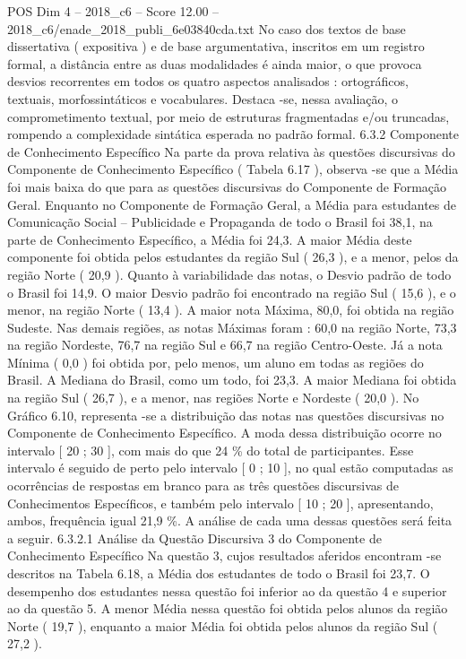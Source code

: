 \begin{textsample}{POS Dim 4 – 2018\_c6 – Score 12.00 – 2018\_c6/enade\_2018\_publi\_6e03840cda.txt}
No caso dos textos de base dissertativa ( expositiva ) e de base argumentativa, inscritos em um registro formal, a distância entre as duas modalidades é ainda maior, o que provoca desvios recorrentes em todos os quatro aspectos analisados : ortográficos, textuais, morfossintáticos e vocabulares.
Destaca -se, nessa avaliação, o comprometimento textual, por meio de estruturas fragmentadas e/ou truncadas, rompendo a complexidade sintática esperada no padrão formal. 6.3.2 Componente de Conhecimento Específico Na parte da prova relativa às questões discursivas do Componente de Conhecimento Específico ( Tabela 6.17 ), observa -se que a Média foi mais baixa do que para as questões discursivas do Componente de Formação Geral.
Enquanto no Componente de Formação Geral, a Média para estudantes de Comunicação Social – Publicidade e Propaganda de todo o Brasil foi 38,1, na parte de Conhecimento Específico, a Média foi 24,3.
A maior Média deste componente foi obtida pelos estudantes da região Sul ( 26,3 ), e a menor, pelos da região Norte ( 20,9 ).
Quanto à variabilidade das notas, o Desvio padrão de todo o Brasil foi 14,9.
O maior Desvio padrão foi encontrado na região Sul ( 15,6 ), e o menor, na região Norte ( 13,4 ).
A maior nota Máxima, 80,0, foi obtida na região Sudeste.
Nas demais regiões, as notas Máximas foram : 60,0 na região Norte, 73,3 na região Nordeste, 76,7 na região Sul e 66,7 na região Centro-Oeste.
Já a nota Mínima ( 0,0 ) foi obtida por, pelo menos, um aluno em todas as regiões do Brasil.
A Mediana do Brasil, como um todo, foi 23,3.
A maior Mediana foi obtida na região Sul ( 26,7 ), e a menor, nas regiões Norte e Nordeste ( 20,0 ).
No Gráfico 6.10, representa -se a distribuição das notas nas questões discursivas no Componente de Conhecimento Específico.
A moda dessa distribuição ocorre no intervalo [ 20 ; 30 ], com mais do que 24 \% do total de participantes.
Esse intervalo é seguido de perto pelo intervalo [ 0 ; 10 ], no qual estão computadas as ocorrências de respostas em branco para as três questões discursivas de Conhecimentos Específicos, e também pelo intervalo [ 10 ; 20 ], apresentando, ambos, frequência igual 21,9 \%.
A análise de cada uma dessas questões será feita a seguir. 6.3.2.1 Análise da Questão Discursiva 3 do Componente de Conhecimento Específico Na questão 3, cujos resultados aferidos encontram -se descritos na Tabela 6.18, a Média dos estudantes de todo o Brasil foi 23,7.
O desempenho dos estudantes nessa questão foi inferior ao da questão 4 e superior ao da questão 5.
A menor Média nessa questão foi obtida pelos alunos da região Norte ( 19,7 ), enquanto a maior Média foi obtida pelos alunos da região Sul ( 27,2 ).

\end{textsample}
